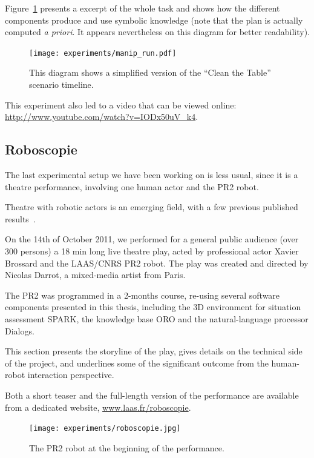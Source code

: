 Figure~\ref{fig|cleantable-timeline} presents a excerpt of the whole task and
shows how the different components produce and use symbolic knowledge (note
that the plan is actually computed {\it a priori}. It appears nevertheless on
this diagram for better readability).

\begin{figure}
    \centering
    \texttt{[image: experiments/manip\_run.pdf]}

    \caption{This diagram shows a simplified version of the ``Clean the Table'' scenario timeline.}

    \label{fig|cleantable-timeline}
\end{figure}


This experiment also led to a video that can be viewed online:
\url{http://www.youtube.com/watch?v=IODx50uV_k4}.


\subsection{Roboscopie}
\label{sect|roboscopie}

The last experimental setup we have been working on is less usual, since it is
a theatre performance, involving one human actor and the PR2 robot.

Theatre with robotic actors is an emerging field, with a few previous published
results~\cite{Breazeal2003, Lin2009, Mavridis2009}.

On the 14th of October 2011, we performed for a general public audience (over
300 persons) a 18 min long live theatre play, acted by professional actor
Xavier Brossard and the LAAS/CNRS PR2 robot. The play was created and directed
by Nicolas Darrot, a mixed-media artist from Paris.

The PR2 was programmed in a 2-months course, re-using several software
components presented in this thesis, including the 3D environment for situation
assessment SPARK, the knowledge base ORO and the natural-language
processor {\sc Dialogs}.

This section presents the storyline of the play, gives details on the technical
side of the project, and underlines some of the significant outcome from the
human-robot interaction perspective.

Both a short teaser and the full-length version of the performance are
available from a dedicated website, \url{www.laas.fr/roboscopie}.

\begin{figure}
    \centering
    \texttt{[image: experiments/roboscopie.jpg]}
    \caption{The PR2 robot at the beginning of the performance.}
    \label{fig|pr2-opens-curtains}
\end{figure}


